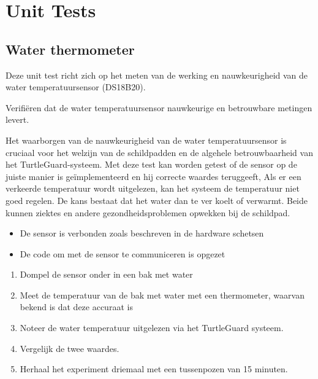 \documentclass[a4paper]{report}
\newcommand{\turtleguard}{\mbox{TurtleGuard\texttrademark}\xspace}
\begin{document}
\section{Unit Tests}

\subsection{Water thermometer}

\begin{tcolorbox}[colback=white, colframe=black, title=Beschrijving van de Unit]
Deze unit test richt zich op het meten van de werking en nauwkeurigheid van de water temperatuursensor (DS18B20). 
\end{tcolorbox}

\begin{tcolorbox}[colback=white, colframe=black, title=Test Doel]
Verifiëren dat de water temperatuursensor nauwkeurige en betrouwbare metingen levert.
\end{tcolorbox}

\begin{tcolorbox}[colback=white, colframe=black, title=Test Motivatie]
Het waarborgen van de nauwkeurigheid van de water temperatuursensor is cruciaal voor het welzijn van de schildpadden en de algehele betrouwbaarheid van het \turtleguard-systeem.
Met deze test kan worden getest of de sensor op de juiste manier is geïmplementeerd en hij correcte waardes teruggeeft,
Als er een verkeerde temperatuur wordt uitgelezen, kan het systeem de temperatuur niet goed regelen. De kans bestaat dat het water dan te ver koelt of verwarmt. 
Beide kunnen ziektes en andere gezondheidsproblemen opwekken bij de schildpad.
\end{tcolorbox}

\begin{tcolorbox}[colback=white, colframe=black, title=Test Criteria]
  \begin{itemize}
    \item De sensor is verbonden zoals beschreven in de hardware schetsen 
    \item De code om met de sensor te communiceren is opgezet 
  \end{itemize}
\end{tcolorbox}



\begin{tcolorbox}[colback=white, colframe=black, title=Test Stappen]
  \begin{enumerate}
    \item Dompel de sensor onder in een bak met water 
    \item Meet de temperatuur van de bak met water met een thermometer, waarvan bekend is dat deze accuraat is 
    \item Noteer de water temperatuur uitgelezen via het \turtleguard systeem. 
    \item Vergelijk de twee waardes. 
    \item Herhaal het experiment driemaal met een tussenpozen van 15 minuten. 
  \end{enumerate}
\end{tcolorbox}
\end{document}
